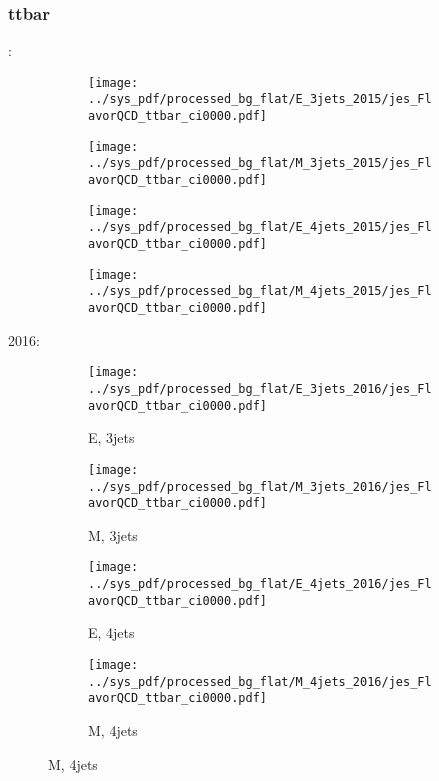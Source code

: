 \documentclass{beamer}
\begin{document}
\begin{frame}
\frametitle{ttbar}
\fontsize{5}{1}:
\begin{figure}
\centering
\begin{subfigure}[b]{0.24\textwidth}
\texttt{[image: ../sys\_pdf/processed\_bg\_flat/E\_3jets\_2015/jes\_FlavorQCD\_ttbar\_ci0000.pdf]}
\end{subfigure}
\begin{subfigure}[b]{0.24\textwidth}
\texttt{[image: ../sys\_pdf/processed\_bg\_flat/M\_3jets\_2015/jes\_FlavorQCD\_ttbar\_ci0000.pdf]}
\end{subfigure}
\begin{subfigure}[b]{0.24\textwidth}
\texttt{[image: ../sys\_pdf/processed\_bg\_flat/E\_4jets\_2015/jes\_FlavorQCD\_ttbar\_ci0000.pdf]}
\end{subfigure}
\begin{subfigure}[b]{0.24\textwidth}
\texttt{[image: ../sys\_pdf/processed\_bg\_flat/M\_4jets\_2015/jes\_FlavorQCD\_ttbar\_ci0000.pdf]}
\end{subfigure}
\end{figure}
2016:
\begin{figure}
\centering
\begin{subfigure}[b]{0.24\textwidth}
\texttt{[image: ../sys\_pdf/processed\_bg\_flat/E\_3jets\_2016/jes\_FlavorQCD\_ttbar\_ci0000.pdf]}
\captionsetup{font=tiny}
\caption{E, 3jets}
\end{subfigure}
\begin{subfigure}[b]{0.24\textwidth}
\texttt{[image: ../sys\_pdf/processed\_bg\_flat/M\_3jets\_2016/jes\_FlavorQCD\_ttbar\_ci0000.pdf]}
\captionsetup{font=tiny}
\caption{M, 3jets}
\end{subfigure}
\begin{subfigure}[b]{0.24\textwidth}
\texttt{[image: ../sys\_pdf/processed\_bg\_flat/E\_4jets\_2016/jes\_FlavorQCD\_ttbar\_ci0000.pdf]}
\captionsetup{font=tiny}
\caption{E, 4jets}
\end{subfigure}
\begin{subfigure}[b]{0.24\textwidth}
\texttt{[image: ../sys\_pdf/processed\_bg\_flat/M\_4jets\_2016/jes\_FlavorQCD\_ttbar\_ci0000.pdf]}
\captionsetup{font=tiny}
\caption{M, 4jets}
\end{subfigure}
\end{figure}
\end{frame}
\end{document}
